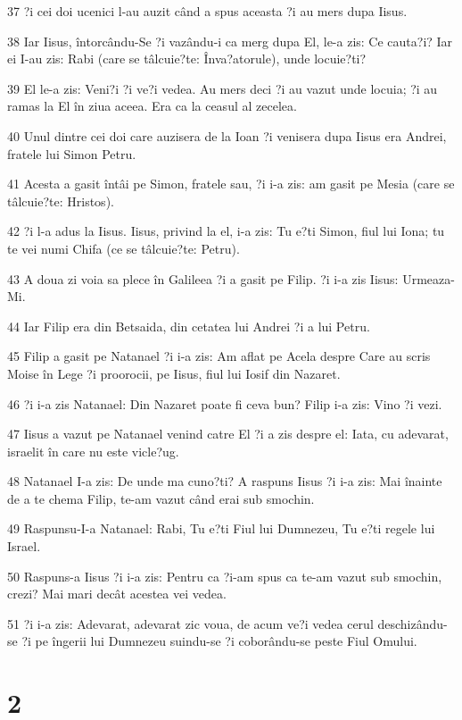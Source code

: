 \par 37 ?i cei doi ucenici l-au auzit când a spus aceasta ?i au mers dupa Iisus.
\par 38 Iar Iisus, întorcându-Se ?i vazându-i ca merg dupa El, le-a zis: Ce cauta?i? Iar ei I-au zis: Rabi (care se tâlcuie?te: Înva?atorule), unde locuie?ti?
\par 39 El le-a zis: Veni?i ?i ve?i vedea. Au mers deci ?i au vazut unde locuia; ?i au ramas la El în ziua aceea. Era ca la ceasul al zecelea.
\par 40 Unul dintre cei doi care auzisera de la Ioan ?i venisera dupa Iisus era Andrei, fratele lui Simon Petru.
\par 41 Acesta a gasit întâi pe Simon, fratele sau, ?i i-a zis: am gasit pe Mesia (care se tâlcuie?te: Hristos).
\par 42 ?i l-a adus la Iisus. Iisus, privind la el, i-a zis: Tu e?ti Simon, fiul lui Iona; tu te vei numi Chifa (ce se tâlcuie?te: Petru).
\par 43 A doua zi voia sa plece în Galileea ?i a gasit pe Filip. ?i i-a zis Iisus: Urmeaza-Mi.
\par 44 Iar Filip era din Betsaida, din cetatea lui Andrei ?i a lui Petru.
\par 45 Filip a gasit pe Natanael ?i i-a zis: Am aflat pe Acela despre Care au scris Moise în Lege ?i proorocii, pe Iisus, fiul lui Iosif din Nazaret.
\par 46 ?i i-a zis Natanael: Din Nazaret poate fi ceva bun? Filip i-a zis: Vino ?i vezi.
\par 47 Iisus a vazut pe Natanael venind catre El ?i a zis despre el: Iata, cu adevarat, israelit în care nu este vicle?ug.
\par 48 Natanael I-a zis: De unde ma cuno?ti? A raspuns Iisus ?i i-a zis: Mai înainte de a te chema Filip, te-am vazut când erai sub smochin.
\par 49 Raspunsu-I-a Natanael: Rabi, Tu e?ti Fiul lui Dumnezeu, Tu e?ti regele lui Israel.
\par 50 Raspuns-a Iisus ?i i-a zis: Pentru ca ?i-am spus ca te-am vazut sub smochin, crezi? Mai mari decât acestea vei vedea.
\par 51 ?i i-a zis: Adevarat, adevarat zic voua, de acum ve?i vedea cerul deschizându-se ?i pe îngerii lui Dumnezeu suindu-se ?i coborându-se peste Fiul Omului.

\chapter{2}

